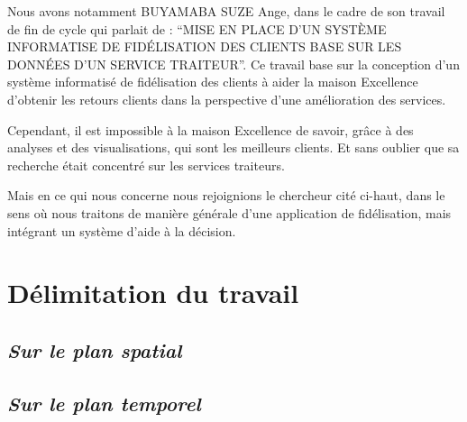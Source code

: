 \documentclass[a4paper,12pt,oneside]{book}
\begin{document}
        Nous avons notamment BUYAMABA SUZE Ange, dans le cadre de son travail de fin de cycle
        qui parlait de : \enquote{MISE EN PLACE D’UN SYSTÈME INFORMATISE DE FIDÉLISATION DES CLIENTS BASE SUR LES
        DONNÉES D’UN SERVICE TRAITEUR}. Ce travail base sur la conception d’un système informatisé de fidélisation des clients
        à aider la maison Excellence d’obtenir les retours clients dans la perspective d’une amélioration des services.\cite{Buyamba2017}
        \newline

        Cependant, il est impossible à la maison Excellence de savoir, grâce à des analyses et des visualisations, qui
        sont les meilleurs clients. Et sans oublier que sa recherche était concentré sur les services traiteurs. 
        \newline

        Mais en ce qui nous concerne nous rejoignions le chercheur cité ci-haut, dans le sens où nous traitons de manière
        générale d’une application de fidélisation, mais intégrant un système d’aide à la décision.
        \section[Délimitation du travail]{Délimitation du travail}
            \subsection[Sur le plan spatial]{\textit{Sur le plan spatial}}

            \subsection[Sur le plan temporel]{\textit{Sur le plan temporel}}
        
\end{document}
